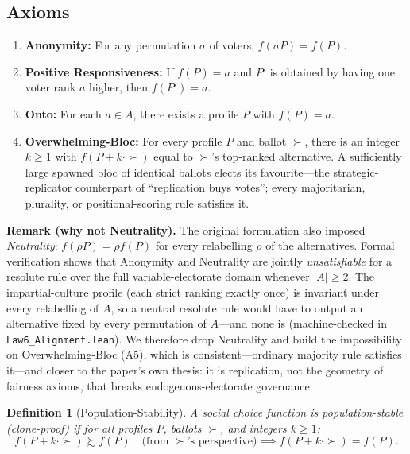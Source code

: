 \documentclass[12pt]{article}
\newtheorem{definition}[theorem]{Definition}
\newcommand{\added}[1]{\textbf{#1}}
\begin{document}
\subsection{Axioms}

\begin{enumerate}
    \item[\textbf{(A1)}] \textbf{Anonymity:} For any permutation $\sigma$ of voters, $f(\sigma P) = f(P)$.
    \item[\textbf{(A3)}] \textbf{Positive Responsiveness:} If $f(P) = a$ and $P'$ is obtained by having one voter rank $a$ higher, then $f(P') = a$.
    \item[\textbf{(A4)}] \textbf{Onto:} For each $a \in A$, there exists a profile $P$ with $f(P) = a$.
    \item[\textbf{(A5)}] \textbf{Overwhelming-Bloc:} For every profile $P$ and ballot $\succ$, there is an integer $k \geq 1$ with $f(P + k \cdot \succ)$ equal to $\succ$'s top-ranked alternative. A sufficiently large spawned bloc of identical ballots elects its favourite---the strategic-replicator counterpart of ``replication buys votes''; every majoritarian, plurality, or positional-scoring rule satisfies it.
\end{enumerate}

\noindent\added{\textbf{Remark (why not Neutrality).}} The original formulation also imposed \emph{Neutrality}: $f(\rho P) = \rho f(P)$ for every relabelling $\rho$ of the alternatives. Formal verification shows that Anonymity and Neutrality are jointly \emph{unsatisfiable} for a resolute rule over the full variable-electorate domain whenever $|A| \geq 2$. The impartial-culture profile (each strict ranking exactly once) is invariant under every relabelling of $A$, so a neutral resolute rule would have to output an alternative fixed by every permutation of $A$---and none is (machine-checked in \texttt{Law6\_Alignment.lean}). We therefore drop Neutrality and build the impossibility on Overwhelming-Bloc (A5), which is consistent---ordinary majority rule satisfies it---and closer to the paper's own thesis: it is replication, not the geometry of fairness axioms, that breaks endogenous-electorate governance.

\begin{definition}[Population-Stability]
A social choice function is \emph{population-stable} (clone-proof) if for all profiles $P$, ballots $\succ$, and integers $k \geq 1$:
\[
f(P + k \cdot \succ) \succsim f(P) \quad \text{(from } \succ \text{'s perspective)} \implies f(P + k \cdot \succ) = f(P).
\]
\end{definition}
\end{document}
